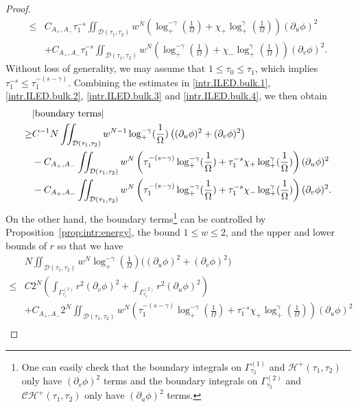 \documentclass[10pt, reqno]{amsart}
\theoremstyle{definition}
\theoremstyle{remark}
\numberwithin{equation}{section}
\newcommand{\rd}{\partial}
\newcommand{\bb}{\Big}
\newcommand{\0}{\emptyset}
\newcommand{\gmm}{\gamma}
\newcommand{\Gmm}{\Gamma}
\newcommand{\Omg}{\Omega}
\newcommand{\calC}{\mathcal C}
\newcommand{\calD}{\mathcal D}
\newcommand{\calH}{\mathcal H}
\newcommand{\f}{\frac}
\newcommand{\CH}{\calC \calH^{+}}		%
\newcommand{\EH}{\calH^{+}}
\begin{document}
\begin{proof}
\begin{equation}
\begin{split}
\leq &C_{A_+,A_-}\tau_1^{-s}\iint_{\calD(\tau_{1}, \tau_{2})} w^N \left( \log_+^{-\gamma}(\f{1}{\Omg})+\chi_+\log_+^{\gamma}(\f{1}{\Omg})\right)(\rd_u\phi)^2\\
	&+C_{A_+,A_-}\tau_1^{-s}\iint_{\calD(\tau_{1}, \tau_{2})} w^N \left( \log_+^{-\gamma}(\f{1}{\Omg})+\chi_-\log_+^{\gamma}(\f{1}{\Omg}) \right)(\rd_v\phi)^2.
\end{split}
\end{equation}
Without loss of generality, we may assume that $1 \leq \tau_{0} \leq \tau_{1}$, which implies $\tau_{1}^{-s} \leq \tau_{1}^{-(s - \gmm)}$.
Combining the estimates in \eqref{intr.ILED.bulk.1}, \eqref{intr.ILED.bulk.2}, \eqref{intr.ILED.bulk.3} and \eqref{intr.ILED.bulk.4}, we then obtain
\begin{equation*}
\begin{split}
	&|\hbox{boundary terms}| \\
	\geq & C^{-1} N \iint_{\calD(\tau_{1}, \tau_{2})} w^{N-1} \log_+^{-\gamma}(\f 1{\Omg}) \left((\rd_{u} \phi)^{2} + (\rd_{v} \phi)^{2}\right)\\
	&-C_{A_+,A_-}\iint_{\calD(\tau_{1}, \tau_{2})} w^N \left( \tau_1^{-(s-\gmm)}\log_+^{-\gamma}(\f{1}{\Omg})+ \tau_1^{-s} \chi_+\log_+^{\gamma}(\f{1}{\Omg}) \right)(\rd_u\phi)^2\\
	&-C_{A_+,A_-}\iint_{\calD(\tau_{1}, \tau_{2})} w^N \left( \tau_1^{-(s-\gmm)} \log_+^{-\gamma}(\f{1}{\Omg})+ \tau_1^{-s} \chi_-\log_+^{\gamma}(\f{1}{\Omg}) \right)(\rd_v\phi)^2.
\end{split}
\end{equation*}
On the other hand, the boundary terms\footnote{One can easily check that the boundary integrals on $\Gamma^{(1)}_{\tau_2}$ and $\EH(\tau_1,\tau_2)$ only have $(\rd_v\phi)^2$ terms and the boundary integrals on $\Gamma^{(2)}_{\tau_2}$ and $\CH(\tau_1,\tau_2)$ only have $(\rd_u\phi)^2$ terms.} can be controlled by Proposition~\ref{prop:intr:energy}, the bound $1 \leq w \leq 2$, and the upper and lower bounds of $r$ so that we have
\begin{equation}\label{interior:ILED:last}
\begin{split}
&N\iint_{\calD(\tau_{1}, \tau_{2})} w^{N} \log_+^{-\gamma}(\f 1{\Omg}) \bb( (\rd_{u} \phi)^{2} + (\rd_{v} \phi)^{2} \bb)\\
\leq &C 2^N\left(\int_{\Gmm^{(1)}_{\tau_{1}}} r^{2} (\rd_{v} \phi)^{2} + \int_{\Gmm^{(2)}_{\tau_{1}}} r^{2} (\rd_{u} \phi)^{2}\right)\\
& +C_{A_+,A_-} 2^N \iint_{\calD(\tau_{1}, \tau_{2})} w^N \left( \tau_1^{-(s-\gmm)} \log_+^{-\gamma}(\f{1}{\Omg})+ \tau_1^{-s} \chi_+\log_+^{\gamma}(\f{1}{\Omg}) \right) (\rd_u\phi)^2\\

\end{split}
\end{equation}
\end{proof}
\end{document}
